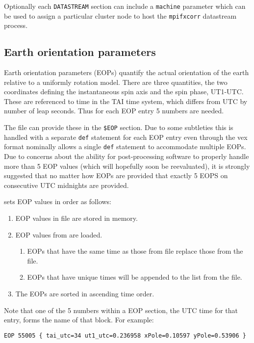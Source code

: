 \documentclass[12pt]{article}
\begin{document}
Optionally each {\tt DATASTREAM} section can include a {\tt machine} parameter which can be used to assign a particular cluster node to host the {\tt mpifxcorr} datastream process.



\subsection{Earth orientation parameters}

Earth orientation parameters (EOPs) quantify the actual orientation of the earth relative to a uniformly rotation model.
There are three quantities, the two coordinates defining the instantaneous spin axis and the spin phase, UT1-UTC.
These are referenced to time in the TAI time system, which differs from UTC by number of leap seconds.
Thus for each EOP entry 5 numbers are needed.

The \vx file can provide these in the {\tt \$EOP} section.
Due to some subtleties this is handled with a separate {\tt def} statement for each EOP entry even through the vex format nominally allows a single {\tt def} statement to accommodate multiple EOPs.
Due to concerns about the ability for post-processing software to properly handle more than 5 EOP values (which will hopefully soon be reevaluated), it is strongly suggested that no matter how EOPs are provided that exactly 5 EOPS on consecutive UTC midnights are provided.

\vd sets EOP values in order as follows:
\begin{enumerate}
\item EOP values in \vx file are stored in memory.
\item EOP values from \vd are loaded.
\begin{enumerate}
\item EOPs that have the same time as those from \vx file replace those from the \vx file.
\item EOPs that have unique times will be appended to the list from the \vx file.
\end{enumerate}
\item The EOPs are sorted in ascending time order.
\end{enumerate}

Note that one of the 5 numbers within a \vd EOP section, the UTC time for that entry, forms the name of that block.
For example:

{\tt EOP 55005 \{ tai\_utc=34 ut1\_utc=0.236958 xPole=0.10597 yPole=0.53906 \} }
\end{document}
